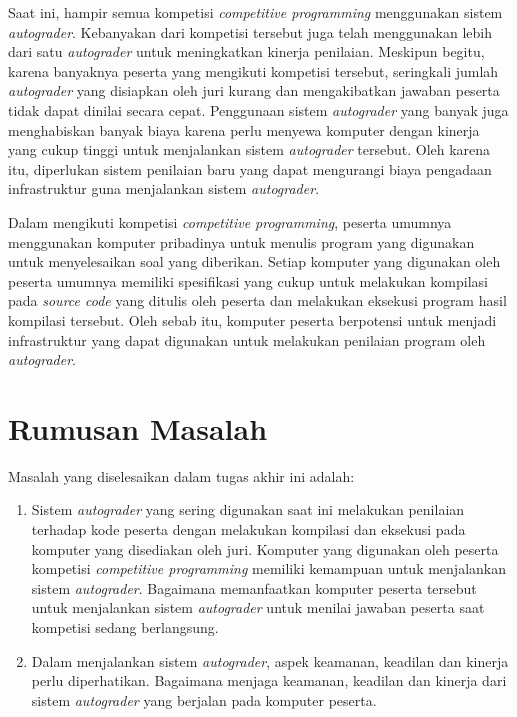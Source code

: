 \par Saat ini, hampir semua kompetisi \textit{competitive programming} menggunakan sistem \textit{autograder}. Kebanyakan dari kompetisi tersebut juga telah menggunakan lebih dari satu \textit{autograder} untuk meningkatkan kinerja penilaian. Meskipun begitu, karena banyaknya peserta yang mengikuti kompetisi tersebut, seringkali jumlah \textit{autograder} yang disiapkan oleh juri kurang dan mengakibatkan jawaban peserta tidak dapat dinilai secara cepat. Penggunaan sistem \textit{autograder} yang banyak juga menghabiskan banyak biaya karena perlu menyewa komputer dengan kinerja yang cukup tinggi untuk menjalankan sistem \textit{autograder} tersebut. Oleh karena itu, diperlukan sistem penilaian baru yang dapat mengurangi biaya pengadaan infrastruktur guna menjalankan sistem \textit{autograder}.

\par Dalam mengikuti kompetisi \textit{competitive programming}, peserta umumnya menggunakan komputer pribadinya untuk menulis program yang digunakan untuk menyelesaikan soal yang diberikan. Setiap komputer yang digunakan oleh peserta umumnya memiliki spesifikasi yang cukup untuk melakukan kompilasi pada \textit{source code} yang ditulis oleh peserta dan melakukan eksekusi program hasil kompilasi tersebut. Oleh sebab itu, komputer peserta berpotensi untuk menjadi infrastruktur yang dapat digunakan untuk melakukan penilaian program oleh \textit{autograder}.

\section{Rumusan Masalah}

\par Masalah yang diselesaikan dalam tugas akhir ini adalah:
\begin{enumerate}

	\item Sistem \textit{autograder} yang sering digunakan saat ini melakukan penilaian terhadap kode peserta dengan melakukan kompilasi dan eksekusi pada komputer yang disediakan oleh juri. Komputer yang digunakan oleh peserta kompetisi \textit{competitive programming} memiliki kemampuan untuk menjalankan sistem \textit{autograder}. Bagaimana memanfaatkan komputer peserta tersebut untuk menjalankan sistem \textit{autograder} untuk menilai jawaban peserta saat kompetisi sedang berlangsung.
	
	\item Dalam menjalankan sistem \textit{autograder}, aspek keamanan, keadilan dan kinerja perlu diperhatikan. Bagaimana menjaga keamanan, keadilan dan kinerja dari sistem \textit{autograder} yang berjalan pada komputer peserta.

\end{enumerate}

